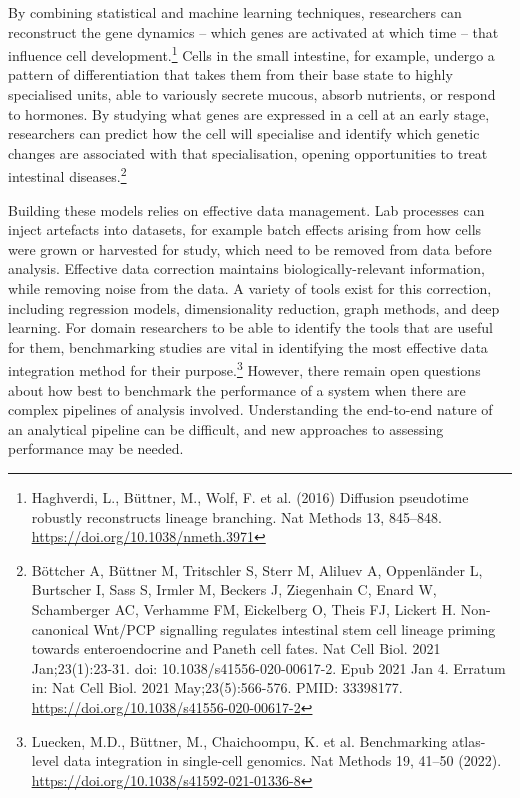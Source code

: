 By combining statistical and machine learning techniques, researchers
can reconstruct the gene dynamics -- which genes are activated at which
time -- that influence cell development.\footnote{Haghverdi, L.,
  Büttner, M., Wolf, F. et al. (2016) Diffusion pseudotime robustly
  reconstructs lineage branching. Nat Methods 13, 845--848.
  \href{https://doi.org/10.1038/nmeth.3971}{\uline{https://doi.org/10.1038/nmeth.3971}}}
Cells in the small intestine, for example, undergo a pattern of
differentiation that takes them from their base state to highly
specialised units, able to variously secrete mucous, absorb nutrients,
or respond to hormones. By studying what genes are expressed in a cell
at an early stage, researchers can predict how the cell will specialise
and identify which genetic changes are associated with that
specialisation, opening opportunities to treat intestinal
diseases.\footnote{Böttcher A, Büttner M, Tritschler S, Sterr M, Aliluev
  A, Oppenländer L, Burtscher I, Sass S, Irmler M, Beckers J, Ziegenhain
  C, Enard W, Schamberger AC, Verhamme FM, Eickelberg O, Theis FJ,
  Lickert H. Non-canonical Wnt/PCP signalling regulates intestinal stem
  cell lineage priming towards enteroendocrine and Paneth cell fates.
  Nat Cell Biol. 2021 Jan;23(1):23-31. doi: 10.1038/s41556-020-00617-2.
  Epub 2021 Jan 4. Erratum in: Nat Cell Biol. 2021 May;23(5):566-576.
  PMID: 33398177. \url{https://doi.org/10.1038/s41556-020-00617-2}}

Building these models relies on effective data management. Lab processes
can inject artefacts into datasets, for example batch effects arising
from how cells were grown or harvested for study, which need to be
removed from data before analysis. Effective data correction maintains
biologically-relevant information, while removing noise from the data. A
variety of tools exist for this correction, including regression models,
dimensionality reduction, graph methods, and deep learning. For domain
researchers to be able to identify the tools that are useful for them,
benchmarking studies are vital in identifying the most effective data
integration method for their purpose.\footnote{Luecken, M.D., Büttner,
  M., Chaichoompu, K. et al. Benchmarking atlas-level data integration
  in single-cell genomics. Nat Methods 19, 41--50 (2022).
  \href{https://doi.org/10.1038/s41592-021-01336-8}{\uline{https://doi.org/10.1038/s41592-021-01336-8}}}
However, there remain open questions about how best to benchmark the
performance of a system when there are complex pipelines of analysis
involved. Understanding the end-to-end nature of an analytical pipeline
can be difficult, and new approaches to assessing performance may be
needed.

